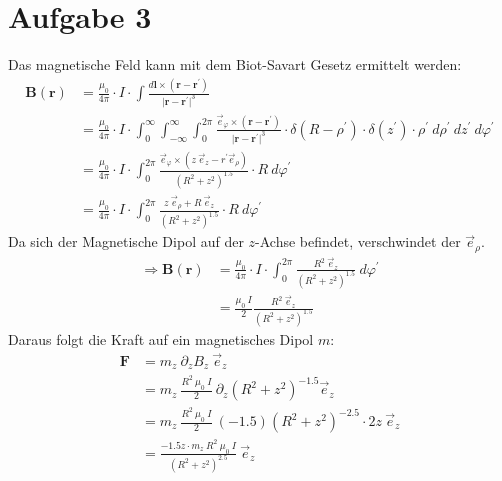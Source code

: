 \documentclass[11pt a4paper]{article}
\begin{document}
\newpage
\setlength{\headheight}{0cm}
\section*{Aufgabe 3}
Das magnetische Feld kann mit dem Biot-Savart Gesetz ermittelt werden:
\begin{align*}
	\mathbf B(\mathbf r) 
	&= \frac{\mu_0}{4\pi} \cdot I \cdot \int 
	\frac{d \mathbf{l} \times (\mathbf{r} - \mathbf{r^\prime})}
	{\vert \mathbf{r} - \mathbf{r^\prime} \vert^3} \\
	&= \frac{\mu_0}{4\pi} \cdot I \cdot 
	\int_0^\infty \int_{-\infty}^\infty \int_0^{2\pi}
	\frac{\vec e_\varphi \times 
	(\mathbf{r} - \mathbf{r^\prime})}
	{\vert \mathbf{r} - \mathbf{r^\prime} \vert^3} \cdot
	\delta(R - \rho^\prime) \cdot \delta(z^\prime) \cdot \rho^\prime
	\ d\rho^\prime \ dz^\prime \ d\varphi^\prime \\
	&= \frac{\mu_0}{4\pi} \cdot I \cdot 
	\int_0^{2\pi}
	\frac{ \vec e_\varphi \times 
	(z \ \vec e_z - r^\prime \vec e_\rho)}
	{\left( R^2 + z^2 \right)^{1.5} } \cdot
	R
	\ d\varphi^\prime \\
	&= \frac{\mu_0}{4\pi} \cdot I \cdot 
	\int_0^{2\pi}
	\frac{z \ \vec e_\rho + R \ \vec e_z}
	{\left( R^2 + z^2 \right)^{1.5} } \cdot
	R
	\ d\varphi^\prime
\end{align*}
Da sich der Magnetische Dipol auf der $z$-Achse befindet, verschwindet der
$\vec e_\rho$.
\begin{align*}
	\Rightarrow
	\mathbf B(\mathbf r) 
	&= \frac{\mu_0}{4\pi} \cdot I \cdot 
	\int_0^{2\pi}
	\frac{R^2 \ \vec e_z}
	{\left( R^2 + z^2 \right)^{1.5} }
	\ d\varphi^\prime \\
	&= \frac{\mu_0 \ I}{2}
	\frac{R^2 \ \vec e_z}
	{\left( R^2 + z^2 \right)^{1.5} }
\end{align*}
Daraus folgt die Kraft auf ein magnetisches Dipol $m$:
\begin{align*}
	\mathbf F 
	&= m_z \ \partial_z B_z \ \vec e_z \\
	&= m_z \ 
	\frac{R^2 \ \mu_0 \ I}{2}
	\ \partial_z 
	\left( R^2 + z^2 \right)^{-1.5}
	\vec e_z \\
	&= m_z \ 
	\frac{R^2 \ \mu_0 \ I}{2}
	\ (-1.5)
	\left( R^2 + z^2 \right)^{-2.5} \cdot 2z \
	\vec e_z \\
	&= \frac{-1.5 z \cdot m_z \ R^2 \ \mu_0 \ I}
	{(R^2 + z^2)^{2.5}} \ \vec e_z
\end{align*}
\end{document}
